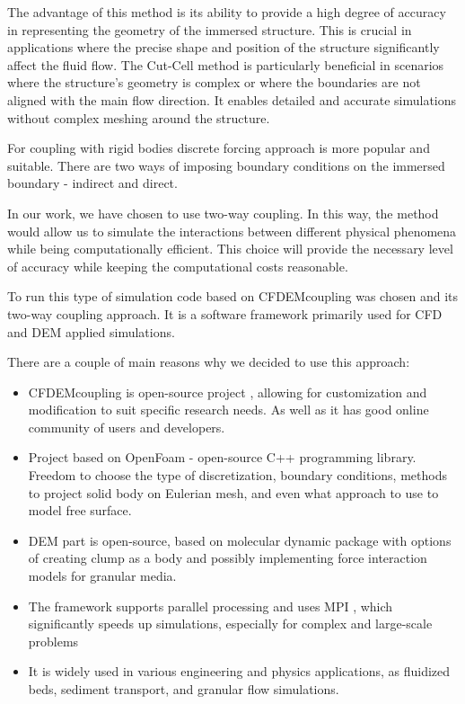 The advantage of this method is its ability to provide a high degree of accuracy in representing the geometry of the immersed structure. This is crucial in applications where the precise shape and position of the structure significantly affect the fluid flow. The Cut-Cell method is particularly beneficial in scenarios where the structure's geometry is complex or where the boundaries are not aligned with the main flow direction. It enables detailed and accurate simulations without complex meshing around the structure. 


For coupling with rigid bodies discrete forcing approach is more popular and suitable. There are two ways of imposing boundary conditions on the immersed boundary - indirect and direct.

In our work, we have chosen to use two-way coupling. In this way, the method would allow us to simulate the interactions between different physical phenomena while being computationally efficient. This choice will provide the necessary level of accuracy while keeping the computational costs reasonable.

To run this type of simulation code based on CFDEMcoupling \cite{kloss2011liggghts} was chosen and its two-way coupling approach. 
It is a software framework primarily used for CFD and DEM applied simulations.

There are a couple of main reasons why we decided to use this approach:
\begin{itemize}
    \item CFDEMcoupling is open-source project , allowing for customization and modification to suit specific research needs. As well as it has good online community of users and developers.
    \item Project based on OpenFoam - open-source C++ programming library. Freedom to choose the type of discretization, boundary conditions, methods to project solid body on Eulerian mesh, and even what approach to use to model free surface. 
    \item DEM part is open-source, based on molecular dynamic package \cite{LAMMPS} with options of creating clump as a body and possibly implementing force interaction models for granular media.
    \item The framework supports parallel processing and uses MPI \cite{MPI}, which significantly speeds up simulations, especially for complex and large-scale problems
    \item It is widely used in various engineering and physics applications, as fluidized beds, sediment transport, and granular flow simulations.
\end{itemize}

